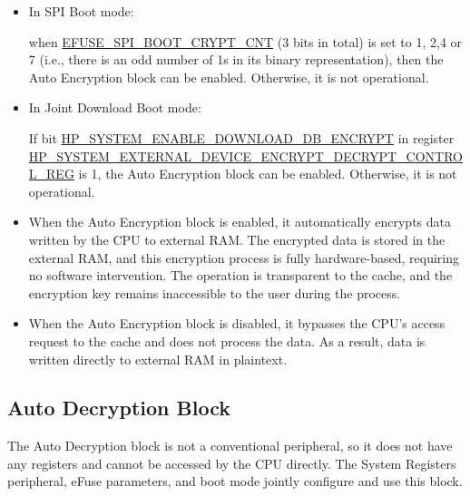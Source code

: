 \documentclass[main\_\_EN.tex]{subfiles}
\begin{document}
\begin{itemize}

    \item In SPI Boot mode:

    when \hyperref[fielddesc:EFUSESPIBOOTCRYPTCNT]{EFUSE\_SPI\_BOOT\_CRYPT\_CNT} (3 bits in total) is set to 1, 2,4 or 7 (i.e., there is an odd number of 1s in its binary representation), then the Auto Encryption block can be enabled. Otherwise, it is not operational.

    \item In Joint Download Boot mode:

    If bit \hyperref[fielddesc:HPSYSTEMENABLEDOWNLOADDBENCRYPT]{HP\_SYSTEM\_ENABLE\_DOWNLOAD\_DB\_ENCRYPT} in register\\ \hyperref[regdesc:HPSYSTEMEXTERNALDEVICEENCRYPTDECRYPTCONTROLREG]{HP\_SYSTEM\_EXTERNAL\_DEVICE\_ENCRYPT\_DECRYPT\_CONTROL\_REG} is 1, the Auto Encryption block can be enabled. Otherwise, it is not operational.

\end{itemize}


\begin{tiplisting}
\vspace{-2em}
\begin{itemize}

\item When the Auto Encryption block is enabled, it automatically encrypts data written by the CPU to external RAM. The encrypted data is stored in the external RAM, and this encryption process is fully hardware-based, requiring no software intervention. The operation is transparent to the cache, and the encryption key remains inaccessible to the user during the process.

\item When the Auto Encryption block is disabled, it bypasses the CPU's access request to the cache and does not process the data. As a result, data is written directly to external RAM in plaintext.
\end{itemize}
\end{tiplisting}

\subsection{Auto Decryption Block}

The Auto Decryption block is not a conventional peripheral, so it does not have any registers and cannot be accessed by the CPU directly. The System Registers peripheral, eFuse parameters, and boot mode jointly configure and use this block.
\end{document}
